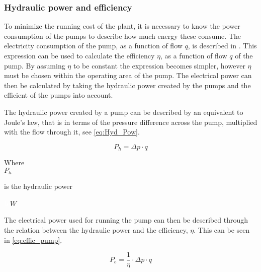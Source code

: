 \subsubsection*{Hydraulic power and efficiency}
To minimize the running cost of the plant, it is necessary to know the power consumption of the pumps to describe how much energy these consume. The electricity consumption of the pump, as a function of flow $q$, is described in \cite{master_aau}. This expression can be used to calculate the efficiency $\eta$, as a function of flow $q$ of the pump. By assuming $\eta$ to be constant the expression becomes simpler, however $\eta$ must be chosen within the operating area of the pump. The electrical power can then be calculated by taking the hydraulic power created by the pumps and the efficient of the pumps into account. 

The hydraulic power created by a pump can be described by an equivalent to Joule's law, that is in terms of the pressure difference across the pump, multiplied with the flow through it, see \eqref{eq:Hyd_Pow}.

\begin{equation}
P_h = \Delta p \cdot q 
\label{eq:Hyd_Pow}
\end{equation}

\begin{minipage}[t]{0.20\textwidth}
Where\\
\hspace*{8mm} $P_h$
\end{minipage}
\begin{minipage}[t]{0.68\textwidth}
\vspace*{2mm}
is the hydraulic power
\end{minipage}
\begin{minipage}[t]{0.10\textwidth}
\vspace*{2mm}
\textcolor{White}{te}$\unit{W}$\\
\end{minipage}	

The electrical power used for running the pump can then be described through the relation between the hydraulic power and the efficiency, $\eta$. This can be seen in \eqref{eq:effic_pump}.

\begin{equation}
P_e = \frac{1}{\eta}\cdot\Delta p \cdot q 
\label{eq:effic_pump}
\end{equation}

